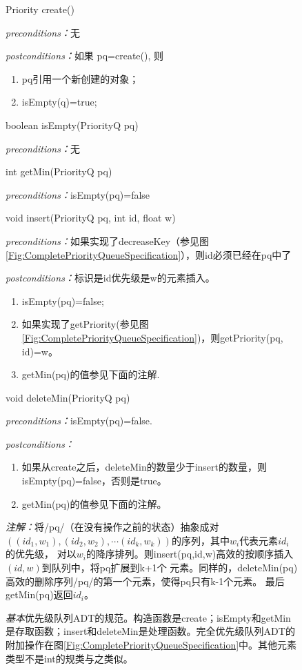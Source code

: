 \begin{figure*}[!t]
\colorbox[rgb]{0.9, 0.9, 0.9}{Priority create()}

\emph{preconditions：}无

\emph{postconditions：}如果 pq=create(), 则
\begin{enumerate}
\item pq引用一个新创建的对象；
\item isEmpty(q)=true;
\end{enumerate}

\colorbox[rgb]{0.9, 0.9, 0.9}{boolean isEmpty(PriorityQ pq)}

\emph{preconditions：}无

\colorbox[rgb]{0.9, 0.9, 0.9}{int getMin(PriorityQ pq)}

\emph{preconditions：}isEmpty(pq)=false

\colorbox[rgb]{0.9, 0.9, 0.9}{void insert(PriorityQ pq, int id, float w)}

\emph{preconditions：}如果实现了decreaseKey（参见图\ref{Fig:CompletePriorityQueueSpecification}），则id必须已经在pq中了

\emph{postconditions：}标识是id优先级是w的元素插入。
\begin{enumerate}
\item isEmpty(pq)=false;
\item 如果实现了getPriority(参见图\ref{Fig:CompletePriorityQueueSpecification})，则getPriority(pq, id)=w。
\item getMin(pq)的值参见下面的注解.
\end{enumerate}

\colorbox[rgb]{0.9, 0.9, 0.9}{void deleteMin(PriorityQ pq)}

\emph{preconditions：}isEmpty(pq)=false.

\emph{postconditions：}
\begin{enumerate}
\item 如果从create之后，deleteMin的数量少于insert的数量，则isEmpty(pq)=false，否则是true。
\item getMin(pq)的值参见下面的注解。
\end{enumerate}

\emph{注解：}将/pq/（在没有操作之前的状态）抽象成对
$((id_1,w_1),(id_2, w_2), \cdots (id_k, w_k))$的序列，其中$w_i$代表元素$id_i$的优先级，
对以$w_i$的降序排列。则insert(pq,id,w)高效的按顺序插入$(id,w)$到队列中，将pq扩展到k+1个
元素。同样的，deleteMin(pq)高效的删除序列/pq/的第一个元素，使得pq只有k-1个元素。
最后getMin(pq)返回$id_i$。

    \caption{ \emph{基本}优先级队列ADT的规范。构造函数是create；isEmpty和getMin
            是存取函数；insert和deleteMin是处理函数。完全优先级队列ADT的
            附加操作在图\ref{Fig:CompletePriorityQueueSpecification}中。其他元素类型不是int的规类与之类似。}
    \label{Fig:BasicPriorityQueueSpecification}
\end{figure*}
